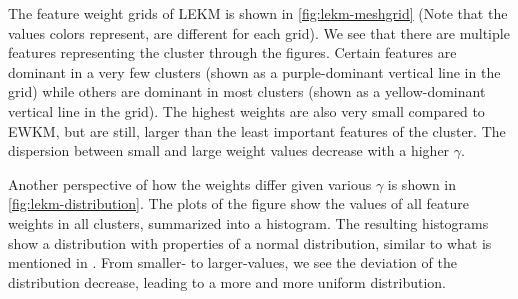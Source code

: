 \documentclass[../report.tex]{subfiles}
\begin{document}
The feature weight grids of LEKM is shown in \cref{fig:lekm-meshgrid} (Note that the values colors represent, are different for each grid). We see that there are multiple features representing the cluster through the figures. Certain features are dominant in a very few clusters (shown as a purple-dominant vertical line in the grid) while others are dominant in most clusters (shown as a yellow-dominant vertical line in the grid). The highest weights are also very small compared to EWKM, but are still, larger than the least important features of the cluster. The dispersion between small and large weight values decrease with a higher $\gamma$.

Another perspective of how the weights differ given various $\gamma$ is shown in \cref{fig:lekm-distribution}. The plots of the figure show the values of all feature weights in all clusters, summarized into a histogram. The resulting histograms show a distribution with properties of a normal distribution, similar to what is mentioned in \cite{Jing2007}. From smaller- to larger-values, we see the deviation of the distribution decrease, leading to a more and more uniform distribution.

\begin{frame}

\begin{figure}
\end{figure}

\end{frame}
\end{document}
